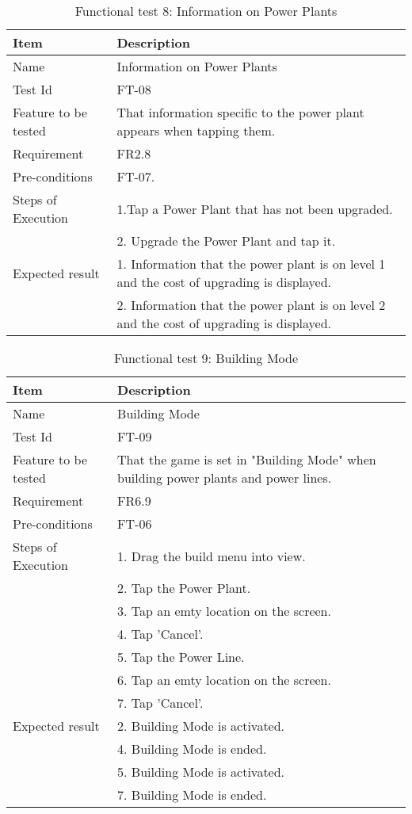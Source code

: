 \begin{table}[H]
\centering
	\begin{tabular}{ l | p{8cm} }
		\hline
		\rowcolor{lightgray}
		{\bf Item} & {\bf Description} \\ \hline
		Name & Information on Power Plants \\ 
		Test Id & FT-08 \\ 
		Feature to be tested & That information specific to the power plant appears when tapping them. \\ 
		Requirement & FR2.8 \\ 
		Pre-conditions & FT-07. \\ 
		Steps of Execution & 1.Tap a Power Plant that has not been upgraded. \\
		& 2. Upgrade the Power Plant and tap it. \\
		Expected result & 1. Information that the power plant is on level 1 and the cost of upgrading is displayed. \\
		& 2. Information that the power plant is on level 2 and the cost of upgrading is displayed. \\
		\hline
	\end{tabular}
	\caption{Functional test 8: Information on Power Plants}
\end{table}

\begin{table}[H]
\centering
	\begin{tabular}{ l | p{8cm} }
		\hline
		\rowcolor{lightgray}
		{\bf Item} & {\bf Description} \\ \hline
		Name & Building Mode \\ 
		Test Id & FT-09 \\ 
		Feature to be tested & That the game is set in "Building Mode" when building power plants and power lines. \\ 
		Requirement & FR6.9 \\ 
		Pre-conditions & FT-06 \\ 
		Steps of Execution & 1. Drag the build menu into view. \\ 
		& 2. Tap the Power Plant. \\
		& 3. Tap an emty location on the screen. \\
		& 4. Tap 'Cancel'. \\
		& 5. Tap the Power Line. \\
		& 6. Tap an emty location on the screen. \\
		& 7. Tap 'Cancel'. \\
		Expected result & 2. Building Mode is activated. \\ 
		& 4. Building Mode is ended. \\
		& 5. Building Mode is activated. \\
		& 7. Building Mode is ended. \\
		\hline
	\end{tabular}
	\caption{Functional test 9: Building Mode}
\end{table}

